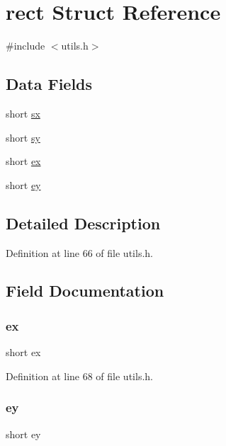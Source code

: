 \hypertarget{structrect}{}\section{rect Struct Reference}
\label{structrect}


{\ttfamily \#include $<$utils.\+h$>$}

\subsection*{Data Fields}
\begin{DoxyCompactItemize}
\item 
short \mbox{\hyperlink{structrect_ad412d3c503fde76edb4b79e9bb5bdee4}{sx}}
\item 
short \mbox{\hyperlink{structrect_a0153fced86e1addd87ec429590e82741}{sy}}
\item 
short \mbox{\hyperlink{structrect_a038ce30271f5797f8c1c7b2e1c8e26df}{ex}}
\item 
short \mbox{\hyperlink{structrect_adeefbf5e85f617bde8321e301d081680}{ey}}
\end{DoxyCompactItemize}


\subsection{Detailed Description}


Definition at line 66 of file utils.\+h.



\subsection{Field Documentation}
\mbox{\label{structrect_a038ce30271f5797f8c1c7b2e1c8e26df}} 
\subsubsection{\texorpdfstring{ex}{ex}}
{\footnotesize\ttfamily short ex}



Definition at line 68 of file utils.\+h.

\mbox{\label{structrect_adeefbf5e85f617bde8321e301d081680}} 
\subsubsection{\texorpdfstring{ey}{ey}}
{\footnotesize\ttfamily short ey}



